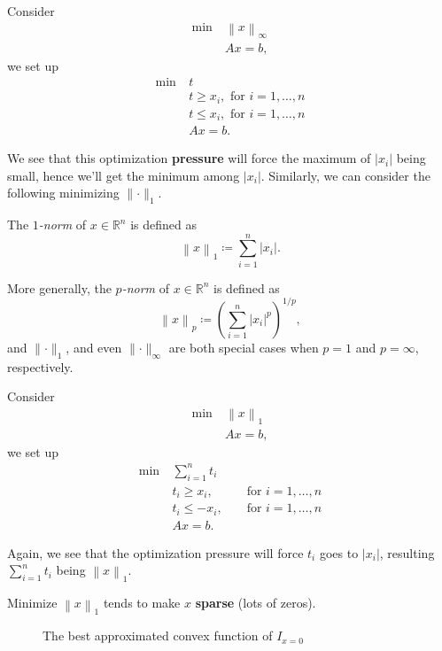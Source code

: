 Consider
\[
	\begin{aligned}
		\min~ & \left\lVert x\right\rVert _{\infty } \\
		      & Ax = b,
	\end{aligned}
\]
we set up
\[
	\begin{aligned}
		\min~ & t                                      \\
		      & t\geq x_i,\text{ for }i = 1, \ldots ,n \\
		      & t\leq x_i,\text{ for }i = 1, \ldots ,n \\
		      & Ax = b.
	\end{aligned}
\]

We see that this optimization \textbf{pressure} will force the maximum of \(\left\vert x_i \right\vert \) being small, hence we'll get the minimum among \(\left\vert x_i \right\vert \). Similarly, we can consider the following minimizing \(\lVert \cdot \rVert _1\).

\begin{definition}[\(1\)-norm]\label{def:1-norm}
	The \emph{\(1\)-norm} of \(x\in \mathbb{R} ^n\) is defined as
	\[
		\left\lVert x\right\rVert _{1} \coloneqq \sum\limits_{i=1}^{n} \left\vert x_i \right\vert.
	\]
\end{definition}

\begin{note}[\(p\)-norm]
	More generally, the \emph{\(p\)-norm} of \(x\in \mathbb{R} ^n\) is defined as
	\[
		\left\lVert x\right\rVert _{p} \coloneqq \left( \sum\limits_{i=1}^{n} \left\vert x_i \right\vert^p \right)^{1 / p},
	\]
	and \(\lVert \cdot \rVert_1 \), and even \(\lVert \cdot \rVert _{\infty }\) are both special cases when \(p = 1\) and \(p = \infty \), respectively.
\end{note}

Consider
\[
	\begin{aligned}
		\min~ & \left\lVert x\right\rVert _1 \\
		      & Ax = b,
	\end{aligned}
\]
we set up
\[
	\begin{alignedat}{3}
		\min~ & \sum\limits_{i=1}^{n} t_i                \\
		& t_i\geq x_i, && \text{ for }i = 1, \ldots ,n  \\
		& t_i\leq -x_i, && \text{ for }i = 1, \ldots ,n \\
		& Ax = b.
	\end{alignedat}
\]

Again, we see that the optimization pressure will force \(t_i\) goes to \(\left\vert x_i \right\vert \), resulting \(\sum_{i=1}^{n} t_i\) being \(\left\lVert x\right\rVert _1\).

\begin{remark}
	Minimize \(\left\lVert x\right\rVert _1\) tends to make \(x\) \textbf{sparse} (lots of zeros).
	\begin{figure}[H]
		\centering
		\caption{The best approximated convex function of \(I_{x = 0}\) }
		\label{fig:1-norm}
	\end{figure}
\end{remark}